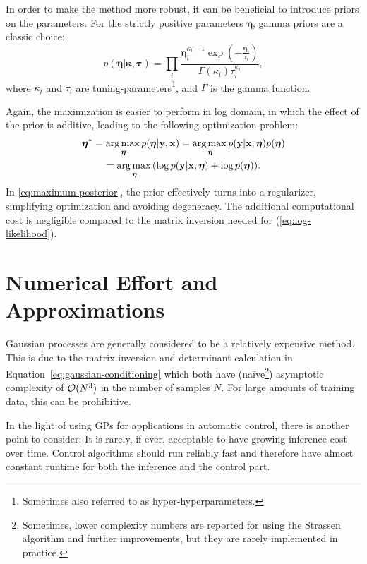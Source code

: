 In order to make the method more robust, it can be beneficial to introduce
priors on the parameters. For the strictly positive parameters
$\boldsymbol{\eta}$, gamma priors
\cite[]{Barber:2011:Bayesian} are a classic choice:
\begin{equation}
  p(\boldsymbol{\eta}| \boldsymbol{\kappa},\boldsymbol{\tau}) = \prod_i
\frac{\boldsymbol{\eta}_i
^{\kappa_i-1}\exp(-\frac{\boldsymbol{\eta}_i}{\tau_i})}{\Gamma(\kappa_i)\tau_i
^{\kappa_i}},
\end{equation}
where $\kappa_i$ and $\tau_i$ are tuning-parameters\footnote{Sometimes also
referred to as hyper-hyperparameters.}, and $\Gamma$ is the gamma function.

Again, the maximization is easier to perform in log domain, in which the effect
of the prior is additive, leading to the following optimization problem:
\begin{multline}
\label{eq:maximum-posterior}
  \boldsymbol{\eta}^* = \underset{\boldsymbol{\eta}}{\argmax}
p(\boldsymbol{\eta}|\mathbf{y},\mathbf{x}) =
\underset{\boldsymbol{\eta}}{\argmax}
p(\mathbf{y}|\mathbf{x},\boldsymbol{\eta})p(\boldsymbol{\eta}) \\
  = \underset{\boldsymbol{\eta}}{\argmax} (\log
p(\mathbf{y}|\mathbf{x},\boldsymbol{\eta}) + \log p(\boldsymbol{\eta}) ).
\end{multline}
In \eqref{eq:maximum-posterior}, the prior effectively turns into a
regularizer, simplifying optimization and avoiding degeneracy. The additional
computational cost is negligible compared to the matrix inversion needed for
(\ref{eq:log-likelihood}).

\section{Numerical Effort and Approximations}

Gaussian processes are generally considered to be a relatively expensive
method. This is due to the matrix inversion and determinant calculation in
Equation~\eqref{eq:gaussian-conditioning} which both have
(na\"ive\footnote{Sometimes, lower complexity numbers are reported for using the
Strassen algorithm  and further improvements,
but they are rarely implemented in
practice.}) asymptotic complexity of
$\mathcal{O}(N^3)$ in the number of samples $N$. For large amounts of training data, this
can be prohibitive.

In the light of using GPs for applications in automatic control, there is
another point to consider: It is rarely, if ever, acceptable to have growing
inference cost over time. Control algorithms should run reliably fast and
therefore have almost constant runtime for both the inference and the control
part.

